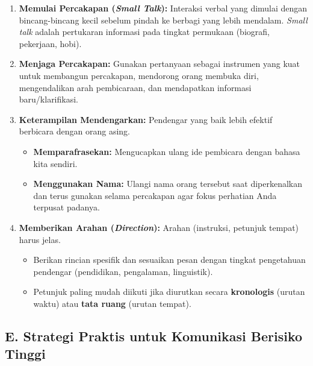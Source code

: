 \documentclass[
  letterpaper,
  DIV=11,
  numbers=noendperiod]{scrreprt}
\providecommand{\tightlist}{%
  \setlength{\itemsep}{0pt}\setlength{\parskip}{0pt}}
\begin{document}
\begin{enumerate}
\def\labelenumi{\arabic{enumi}.}
\tightlist
\item
  \textbf{Memulai Percakapan (\emph{Small Talk}):} Interaksi verbal yang
  dimulai dengan bincang-bincang kecil sebelum pindah ke berbagi yang
  lebih mendalam. \emph{Small talk} adalah pertukaran informasi pada
  tingkat permukaan (biografi, pekerjaan, hobi).
\item
  \textbf{Menjaga Percakapan:} Gunakan pertanyaan sebagai instrumen yang
  kuat untuk membangun percakapan, mendorong orang membuka diri,
  mengendalikan arah pembicaraan, dan mendapatkan informasi
  baru/klarifikasi.
\item
  \textbf{Keterampilan Mendengarkan:} Pendengar yang baik lebih efektif
  berbicara dengan orang asing.

  \begin{itemize}
  \tightlist
  \item
    \textbf{Memparafrasekan:} Mengucapkan ulang ide pembicara dengan
    bahasa kita sendiri.
  \item
    \textbf{Menggunakan Nama:} Ulangi nama orang tersebut saat
    diperkenalkan dan terus gunakan selama percakapan agar fokus
    perhatian Anda terpusat padanya.
  \end{itemize}
\item
  \textbf{Memberikan Arahan (\emph{Direction}):} Arahan (instruksi,
  petunjuk tempat) harus jelas.

  \begin{itemize}
  \tightlist
  \item
    Berikan rincian spesifik dan sesuaikan pesan dengan tingkat
    pengetahuan pendengar (pendidikan, pengalaman, linguistik).
  \item
    Petunjuk paling mudah diikuti jika diurutkan secara
    \textbf{kronologis} (urutan waktu) atau \textbf{tata ruang} (urutan
    tempat).
  \end{itemize}
\end{enumerate}

\subsection{E. Strategi Praktis untuk Komunikasi Berisiko
Tinggi}\label{e.-strategi-praktis-untuk-komunikasi-berisiko-tinggi}
\end{document}
